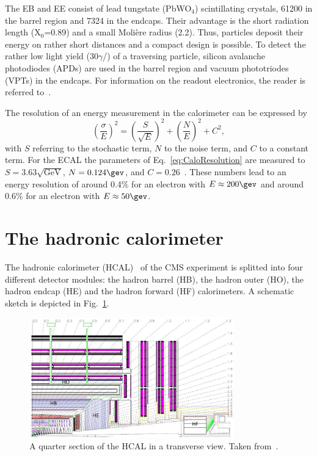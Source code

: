 The EB and EE consist of lead tungstate (PbWO$_4$) scintillating crystals, 61200 in the barrel region and 7324 in the endcaps. 
Their advantage is the short radiation length (X$_0$=0.89\cm) and a small Moli\`ere radius (2.2\cm).
Thus, particles deposit their energy on rather short distances and a compact design is possible.
To detect the rather low light yield (30$\gamma$/\mev) of a traversing particle, silicon avalanche photodiodes (APDs) are used in the barrel region and vacuum  phototriodes (VPTs) in the endcaps.
For information on the readout electronics, the reader is referred to~\cite{bib:CMS:TDR_2006}.

The resolution of an energy measurement in the calorimeter can be expressed by 
\begin{equation}
\label{eq:CaloResolution}
\left( \frac{\sigma}{E} \right)^2 = \left( \frac{S}{\sqrt{E}} \right)^2 + \left( \frac{N}{E} \right)^2 +C^2,
\end{equation}
with $S$ referring to the stochastic term, $N$ to the noise term, and $C$ to a constant term.
For the ECAL the parameters of Eq.~\eqref{eq:CaloResolution} are measured to $S=3.63\sqrt{\text{GeV}}$, $N=0.124\gev$, and $C=0.26$~\cite{bib:CMS:TDR_2006}. 
These numbers lead to an energy resolution of around 0.4\% for an electron with $E \approx 200\gev$ and around 0.6\% for an electron with $E \approx 50\gev$.

\section{The hadronic calorimeter}
The hadronic calorimeter (HCAL)~\cite{bib:CMS:TDR_2006,bib:CMS:TDR_HCAL} of the CMS experiment is splitted into four different detector modules: the hadron barrel (HB), the hadron outer (HO), the hadron endcap (HE) and the hadron forward (HF) calorimeters.
A schematic sketch is depicted in Fig.~\ref{fig:HCAL}.
\begin{figure}[!h]
  \centering
      \includegraphics[width=0.79\textwidth]{figures/experiment/CMS/fig_HCALdiagram.png}
  \caption{A quarter section of the HCAL in a transverse view. Taken from~\cite{bib:CMS:HCAL_Performance_2009}.}  
  \label{fig:HCAL}
\end{figure}

